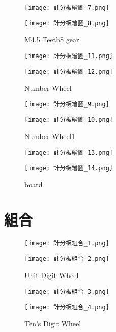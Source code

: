 \begin{figure}[hbt!]
  \centering
  \texttt{[image: 計分板繪圖\_7.png]}
\end{figure}
\begin{figure}[hbt!]
  \centering
  \texttt{[image: 計分板繪圖\_8.png]}
  \caption{M4.5 Teeth8 gear}
  \label{fig:photo6}
\end{figure}

\begin{figure}[hbt!]
  \centering
  \texttt{[image: 計分板繪圖\_11.png]}
\end{figure}
\begin{figure}[hbt!]
  \centering
  \texttt{[image: 計分板繪圖\_12.png]}
  \caption{Number Wheel}
  \label{fig:photo7}
\end{figure}

\begin{figure}[hbt!]
  \centering
  \texttt{[image: 計分板繪圖\_9.png]}
\end{figure}
\begin{figure}[hbt!]
  \centering
  \texttt{[image: 計分板繪圖\_10.png]}
  \caption{Number Wheel1}
  \label{fig:photo8}
\end{figure}

\begin{figure}[hbt!]
  \centering
  \texttt{[image: 計分板繪圖\_13.png]}
\end{figure}
\begin{figure}[hbt!]
  \centering
  \texttt{[image: 計分板繪圖\_14.png]}
  \caption{board}
  \label{fig:photo9}
\end{figure}

\section{組合}
\begin{figure}[hbt!]
  \centering
  \texttt{[image: 計分板組合\_1.png]}
\end{figure}
\begin{figure}[hbt!]
  \centering
  \texttt{[image: 計分板組合\_2.png]}
  \caption{Unit Digit Wheel}
  \label{fig:photo10}
\end{figure}

\begin{figure}[hbt!]
  \centering
  \texttt{[image: 計分板組合\_3.png]}
\end{figure}
\begin{figure}[hbt!]
  \centering
  \texttt{[image: 計分板組合\_4.png]}
  \caption{Ten's Digit Wheel}
  \label{fig:photo11}
\end{figure}

